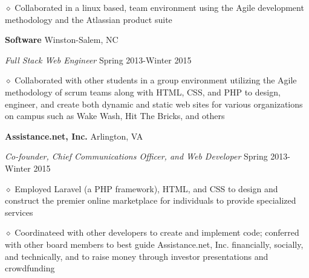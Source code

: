 \documentclass[executivepaper]{extarticle}
\begin{document}
\begin{center}
{\begin{minipage}{7.0in}
\vspace{0.25mm}

{\noindent $\diamond$ {\fontsize{12}{8}\selectfont Collaborated in a linux based, team environment using the Agile development methodology and the Atlassian product suite}}

\vspace{2mm}

{\noindent \textbf{\fontsize{12}{8} Software}} {\hfill \fontsize{10}{8}\selectfont Winston-Salem, NC}

\vspace{0.25mm}

{\noindent \textit{\fontsize{12}{8}\selectfont Full Stack Web Engineer}} {\hfill \fontsize{10}{8}\selectfont Spring 2013-Winter 2015}

\vspace{0.25mm}

{\noindent $\diamond$ {\fontsize{12}{8}\selectfont Collaborated with other students in a group environment utilizing the Agile methodology of scrum teams along with
HTML, CSS, and PHP to design, engineer, and create both dynamic and static web sites for various organizations on campus such as Wake Wash, Hit The Bricks, and others}}

\vspace{2mm}

{\noindent \textbf{\fontsize{12}{8}\selectfont Assistance.net, Inc.}} {\hfill \fontsize{10}{8}\selectfont Arlington, VA}

\vspace{0.25mm}

{\noindent \textit{\fontsize{12}{8}\selectfont Co-founder, Chief Communications Officer, and Web Developer}} {\hfill \fontsize{10}{8}\selectfont Spring 2013-Winter 2015}

\vspace{0.25mm}

{\noindent $\diamond$ {\fontsize{12}{8}\selectfont Employed Laravel (a PHP framework), HTML, and CSS to design and construct the premier online marketplace for individuals to provide specialized services}}

\vspace{0.25mm}

{\noindent $\diamond$ {\fontsize{12}{8}\selectfont Coordinateed with other developers to create and implement code; conferred with other board members to best guide Assistance.net, Inc. financially, socially, and technically,
and to raise money through investor presentations and crowdfunding}}


\end{minipage}}
\end{center}
\end{document}
